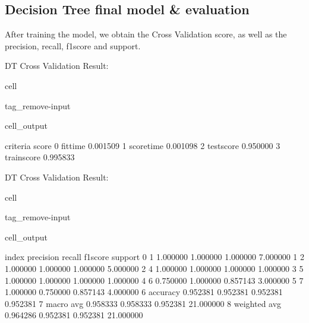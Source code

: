 \documentclass[letterpaper,10pt,english]{jupyterBook}
\begin{document}
\subsection{Decision Tree final model \& evaluation}
\label{\detokenize{analysis:decision-tree-final-model-evaluation}}
\sphinxAtStartPar
After training the model, we obtain the Cross Validation score, as well as the precision, recall, f1\sphinxhyphen{}score and support.

\sphinxAtStartPar
DT Cross Validation Result:

\begin{sphinxuseclass}{cell}
\begin{sphinxuseclass}{tag_remove-input}\begin{sphinxVerbatimOutput}

\begin{sphinxuseclass}{cell_output}
\begin{sphinxVerbatim}[commandchars=\\\{\}]
      criteria     score
0     fit\PYGZus{}time  0.001509
1   score\PYGZus{}time  0.001098
2   test\PYGZus{}score  0.950000
3  train\PYGZus{}score  0.995833
\end{sphinxVerbatim}

\end{sphinxuseclass}\end{sphinxVerbatimOutput}

\end{sphinxuseclass}
\end{sphinxuseclass}
\sphinxAtStartPar
DT Cross Validation Result:

\begin{sphinxuseclass}{cell}
\begin{sphinxuseclass}{tag_remove-input}\begin{sphinxVerbatimOutput}

\begin{sphinxuseclass}{cell_output}
\begin{sphinxVerbatim}[commandchars=\\\{\}]
          index  precision    recall  f1\PYGZhy{}score    support
0             1   1.000000  1.000000  1.000000   7.000000
1             2   1.000000  1.000000  1.000000   5.000000
2             4   1.000000  1.000000  1.000000   1.000000
3             5   1.000000  1.000000  1.000000   1.000000
4             6   0.750000  1.000000  0.857143   3.000000
5             7   1.000000  0.750000  0.857143   4.000000
6      accuracy   0.952381  0.952381  0.952381   0.952381
7     macro avg   0.958333  0.958333  0.952381  21.000000
8  weighted avg   0.964286  0.952381  0.952381  21.000000
\end{sphinxVerbatim}

\end{sphinxuseclass}\end{sphinxVerbatimOutput}

\end{sphinxuseclass}
\end{sphinxuseclass}
\end{document}
